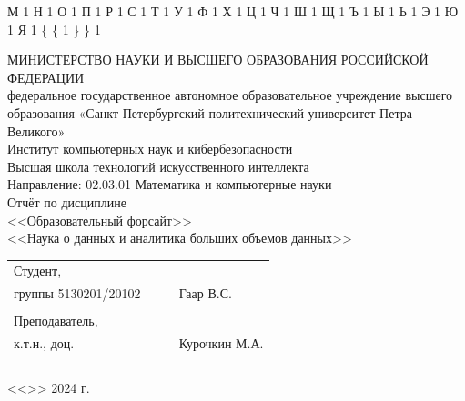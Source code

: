 \documentclass[a4paper, final]{article}
\begin{document}
{  {М}{ {\selectfont{}} }1
  {Н}{ {\selectfont{}} }1
  {О}{ {\selectfont{}} }1
  {П}{ {\selectfont{}} }1
  {Р}{ {\selectfont{}} }1
  {С}{ {\selectfont{}} }1
  {Т}{ {\selectfont{}} }1
  {У}{ {\selectfont{}} }1
  {Ф}{ {\selectfont{}} }1
  {Х}{ {\selectfont{}} }1
  {Ц}{ {\selectfont{}} }1
  {Ч}{ {\selectfont{}} }1
  {Ш}{ {\selectfont{}} }1
  {Щ}{ {\selectfont{}} }1
  {Ъ}{ {\selectfont{}} }1
  {Ы}{ {\selectfont{}} }1
  {Ь}{ {\selectfont{}} }1
  {Э}{ {\selectfont{}} }1
  {Ю}{ {\selectfont{}} }1
  {Я}{ {\selectfont{}} }1
  {\{}{ { {\color{brackets}\{} } }1 %
  {\} }{ { {\color{brackets}\} } } }1 %
}

\begin{center}
\hfill \break
\hfill \break
\normalsize{МИНИСТЕРСТВО НАУКИ И ВЫСШЕГО ОБРАЗОВАНИЯ РОССИЙСКОЙ ФЕДЕРАЦИИ\\
 федеральное государственное автономное образовательное учреждение высшего образования «Санкт-Петербургский политехнический университет Петра Великого»\\[5pt]}
\normalsize{Институт компьютерных наук и кибербезопасности}\\[5pt] 
\normalsize{Высшая школа технологий искусственного интеллекта}\\[5pt] 
\normalsize{Направление: 02.03.01 Математика и компьютерные науки}\\

\hfill \break
\hfill \break
\hfill \break
\large{Отчёт по дисциплине}\\
\large{<<Образовательный форсайт>>}\\
\hfill \break
\large{<<Наука о данных и аналитика больших объемов данных>>}
\hfill \break
\hfill \break
\end{center}
 
\small{ 
\begin{tabular}{lrrl}
\!\!\!Студент, & \hspace{2cm} & & \\
\!\!\!группы 5130201/20102 & \hspace{2cm} & \underline{\hspace{3cm}} &Гаар В.С. \\\\
\!\!\!Преподаватель, \hspace{2cm} & & \\
\!\!\!к.т.н., доц. & \hspace{2cm} & \underline{\hspace{3cm}} &  Курочкин М.А. \\\\
&&\hspace{5cm}
\end{tabular}
\begin{flushright}
<<\underline{\hspace{1cm}}>>\underline{\hspace{2.5cm}} 2024 г.
\end{flushright}
}
\end{document}
